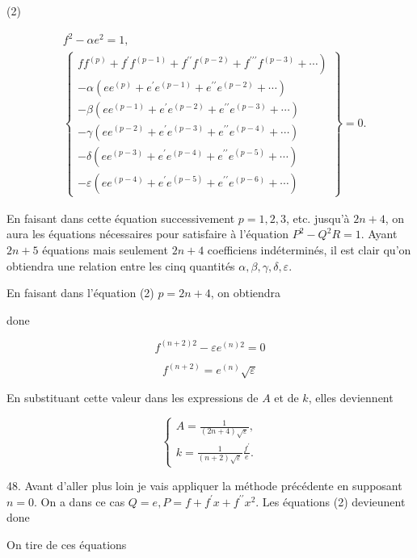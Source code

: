 \documentclass{article}
\begin{document}
(2)

\[
\begin{aligned}
& f^{2}-\alpha e^{2}=1, \\
& \left\{\begin{array}{c}
\left.f f^{(p)}+f^{\prime} f^{(p-1)}+f^{\prime \prime} f^{(p-2)}+f^{\prime \prime \prime} f^{(p-3)}+\cdots\right) \\
-\alpha\left(e e^{(p)}+e^{\prime} e^{(p-1)}+e^{\prime \prime} e^{(p-2)}+\cdots\right) \\
-\beta\left(e e^{(p-1)}+e^{\prime} e^{(p-2)}+e^{\prime \prime} e^{(p-3)}+\cdots\right) \\
-\gamma\left(e e^{(p-2)}+e^{\prime} e^{(p-3)}+e^{\prime \prime} e^{(p-4)}+\cdots\right) \\
-\delta\left(e e^{(p-3)}+e^{\prime} e^{(p-4)}+e^{\prime \prime} e^{(p-5)}+\cdots\right) \\
-\varepsilon\left(e e^{(p-4)}+e^{\prime} e^{(p-5)}+e^{\prime \prime} e^{(p-6)}+\cdots\right)
\end{array}\right\}=0 .
\end{aligned}
\]

En faisant dans cette équation successivement \(p=1,2,3\), etc. jusqu'à \(2 n+4\), on aura les équations nécessaires pour satisfaire à l'équation \(P^{2}-Q^{2} R=1\). Ayant \(2 n+5\) équations mais seulement \(2 n+4\) coefficiens
indéterminés, il est clair qu'on obtiendra une relation entre les cinq quantités \(\alpha, \beta, \gamma, \delta, \varepsilon\).

En faisant dans l'équation (2) \(p=2 n+4\), on obtiendra

done

\[
f^{(n+2) 2}-\varepsilon e^{(n) 2}=0
\]

\[
f^{(n+2)}=e^{(n)} \sqrt{\varepsilon}
\]

En substituant cette valeur dans les expressions de \(A\) et de \(k\), elles deviennent

\[
\left\{\begin{array}{l}
A=\frac{1}{(2 n+4) \sqrt{\varepsilon}}, \\
k=\frac{1}{(n+2) \sqrt{\varepsilon}} \frac{f^{\prime}}{e} .
\end{array}\right.
\]

48. Avant d'aller plus loin je vais appliquer la méthode précédente en supposant \(n=0\). On a dans ce cas \(Q=e, P=f+f^{\prime} x+f^{\prime \prime} x^{2}\). Les équations (2) devieunent done

On tire de ces équations
\end{document}
